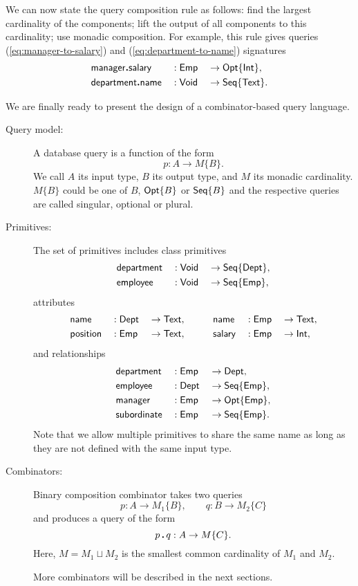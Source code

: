 We can now state the query composition rule as follows: find the largest
cardinality of the components; lift the output of all components to this
cardinality; use monadic composition.  For example, this rule gives queries
(\ref{eq:manager-to-salary}) and (\ref{eq:department-to-name}) signatures
\begin{alignat*}{3}
    & \mathsf{manager}\boldsymbol{.}\mathsf{salary} && : \mathsf{Emp} && \to \mathsf{Opt}{\left\{\mathsf{Int}\right\}}, \\
    & \mathsf{department}\boldsymbol{.}\mathsf{name} && : \mathsf{Void} && \to \mathsf{Seq}{\left\{\mathsf{Text}\right\}}.
\end{alignat*}

We are finally ready to present the design of a combina\-tor-based query
language.

\begin{description}
\item[Query model:]
A database query is a function of the form
\begin{equation*}
    p : A \to M\{B\}.
\end{equation*}
We call $A$ its input type, $B$ its output type, and $M$ its monadic
cardinality.  $M\{B\}$ could be one of $B$, $\mathsf{Opt}{\left\{B\right\}}$ or $\mathsf{Seq}{\left\{B\right\}}$ and
the respective queries are called singular, optional or plural.

\item[Primitives:]
The set of primitives includes class primitives
\begin{alignat*}{3}
    & \mathsf{department} && : \mathsf{Void} && \to \mathsf{Seq}{\left\{\mathsf{Dept}\right\}}, \\
    & \mathsf{employee} && : \mathsf{Void} && \to \mathsf{Seq}{\left\{\mathsf{Emp}\right\}},
\end{alignat*}
attributes
\begin{alignat*}{6}
    & \mathsf{name} && : \mathsf{Dept} && \to \mathsf{Text}, \qquad
    && \mathsf{name} && : \mathsf{Emp} && \to \mathsf{Text}, \\
    & \mathsf{position} && : \mathsf{Emp} && \to \mathsf{Text}, \qquad
    && \mathsf{salary} && : \mathsf{Emp} && \to \mathsf{Int},
\end{alignat*}
and relationships
\begin{alignat*}{3}
    & \mathsf{department} && : \mathsf{Emp} && \to \mathsf{Dept}, \\
    & \mathsf{employee} && : \mathsf{Dept} && \to \mathsf{Seq}{\left\{\mathsf{Emp}\right\}}, \\
    & \mathsf{manager} && : \mathsf{Emp} && \to \mathsf{Opt}{\left\{\mathsf{Emp}\right\}}, \\
    & \mathsf{subordinate} && : \mathsf{Emp} && \to \mathsf{Seq}{\left\{\mathsf{Emp}\right\}}.
\end{alignat*}
Note that we allow multiple primitives to share the same name as long as they
are not defined with the same input type.

\item[Combinators:]
Binary composition combinator takes two queries
\begin{equation*}
    p : A \to M_1\{B\}, \qquad
    q : B \to M_2\{C\}
\end{equation*}
and produces a query of the form
\begin{equation*}
    p\,\boldsymbol{.}\,q : A \to M\{C\}.
\end{equation*}
Here, $M = M_1 \sqcup M_2$ is the smallest common cardinality of $M_1$ and
$M_2$.

More combinators will be described in the next sections.
\end{description}

